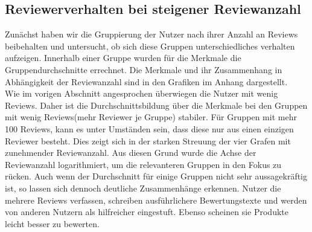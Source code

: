 \documentclass{scrartcl}
\theoremstyle{my_th_style}
\begin{document}
\subsection{Reviewerverhalten bei steigener Reviewanzahl}
Zunächst haben wir die Gruppierung der Nutzer nach ihrer Anzahl an Reviews beibehalten und untersucht, ob sich diese Gruppen unterschiedliches verhalten aufzeigen. Innerhalb einer Gruppe wurden für die Merkmale die Gruppendurchschnitte errechnet. Die Merkmale und ihr Zusammenhang in Abhängigkeit der Reviewanzahl sind in den Grafiken im Anhang dargestellt.\\
Wie im vorigen Abschnitt angesprochen überwiegen die Nutzer mit wenig Reviews. Daher ist die Durchschnittsbildung über die Merkmale bei den Gruppen mit wenig Reviews(mehr Reviewer je Gruppe) stabiler. Für Gruppen mit mehr 100 Reviews, kann es unter Umständen sein, dass diese nur aus einen einzigen Reviewer besteht. Dies zeigt sich in der starken Streuung der vier Grafen mit zunehmender Reviewanzahl. Aus diesen Grund wurde die Achse der Reviewanzahl logarithmiert, um die relevanteren Gruppen in den Fokus zu rücken. Auch wenn der Durchschnitt für einige Gruppen nicht sehr aussagekräftig ist, so lassen sich dennoch deutliche Zusammenhänge erkennen. Nutzer die mehrere Reviews verfassen, schreiben ausführlichere Bewertungstexte und werden von anderen Nutzern als hilfreicher eingestuft. Ebenso scheinen sie Produkte leicht besser zu bewerten.
\end{document}
